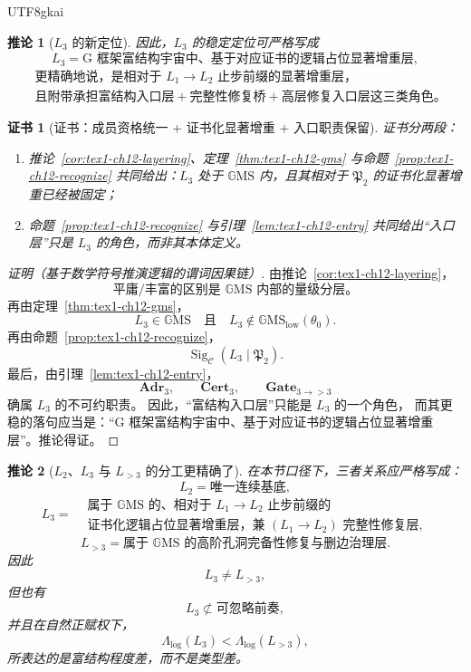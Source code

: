 \documentclass[12pt]{article}
\newtheorem{corollary}{推论}[section]
\newtheorem{Certificate}{证书}[section]
\newcommand{\GMS}{\mathbb{G}\mathrm{MS}}
\begin{document}
\begin{CJK*}{UTF8}{gkai}
\begin{corollary}[\(L_3\) 的新定位]
\label{cor:tex1-ch12-position}
因此，\(L_3\) 的稳定定位可严格写成
\[
  \boxed{
    L_3
    =
    \text{G 框架富结构宇宙中、基于对应证书的逻辑占位显著增重层},
  }
\]
\[
  \boxed{
    \begin{aligned}
      &\text{更精确地说，是相对于 }L_1\to L_2\text{ 止步前缀的显著增重层，}\\
      &\text{且附带承担富结构入口层}
      +\text{完整性修复桥}
      +\text{高层修复入口层}
      \text{这三类角色。}
    \end{aligned}
  }
\]
\end{corollary}

\begin{Certificate}[证书：成员资格统一 + 证书化显著增重 + 入口职责保留]
\label{cert:tex1-ch12-position}
证书分两段：
\begin{enumerate}
  \item 推论~\ref{cor:tex1-ch12-layering}、定理~\ref{thm:tex1-ch12-gms} 与命题~\ref{prop:tex1-ch12-recognize} 共同给出：\(L_3\) 处于
    \(\GMS\) 内，且其相对于 \(\mathfrak P_2\) 的证书化显著增重已经被固定；
  \item 命题~\ref{prop:tex1-ch12-recognize} 与引理~\ref{lem:tex1-ch12-entry} 共同给出“入口层”只是 \(L_3\) 的角色，而非其本体定义。
\end{enumerate}
\end{Certificate}

\begin{proof}[证明（基于数学符号推演逻辑的谓词因果链）]
由推论~\ref{cor:tex1-ch12-layering}，
\[
  \text{平庸/丰富的区别是 }\GMS\text{ 内部的量级分层。}
\]
再由定理~\ref{thm:tex1-ch12-gms}，
\[
  L_3\in\GMS
  \quad\text{且}\quad
  L_3\notin \GMS_{\mathrm{low}}(\theta_0).
\]
再由命题~\ref{prop:tex1-ch12-recognize}，
\[
  \operatorname{Sig}_{\mathcal C}(L_3\mid \mathfrak P_2).
\]
最后，由引理~\ref{lem:tex1-ch12-entry}，
\[
  \mathbf{Adr}_3,\qquad
  \mathbf{Cert}_3,\qquad
  \mathbf{Gate}_{3\to >3}
\]
确属 \(L_3\) 的不可约职责。
因此，“富结构入口层”只能是 \(L_3\) 的一个角色，
而其更稳的落句应当是：“G 框架富结构宇宙中、基于对应证书的逻辑占位显著增重层”。推论得证。
\end{proof}

\begin{corollary}[\(L_2\)、\(L_3\) 与 \(L_{>3}\) 的分工更精确了]
\label{cor:tex1-ch12-split}
在本节口径下，三者关系应严格写成：
\[
  L_2
  =
  \text{唯一连续基底},
\]
\[
  L_3
  =
  \begin{aligned}
    &\text{属于 }\GMS\text{ 的、相对于 }L_1\to L_2\text{ 止步前缀的}\\
    &\text{证书化逻辑占位显著增重层，兼 }(L_1\to L_2)\text{ 完整性修复层},
  \end{aligned}
\]
\[
  L_{>3}
  =
  \text{属于 }\GMS\text{ 的高阶孔洞完备性修复与删边治理层}.
\]
因此
\[
  L_3\neq L_{>3},
\]
但也有
\[
  L_3\not\subset \text{可忽略前奏},
\]
并且在自然正赋权下，
\[
  \Lambda_{\mathrm{log}}(L_3)<\Lambda_{\mathrm{log}}(L_{>3}),
\]
所表达的是富结构程度差，而不是类型差。
\end{corollary}


\end{CJK*}
\end{document}
